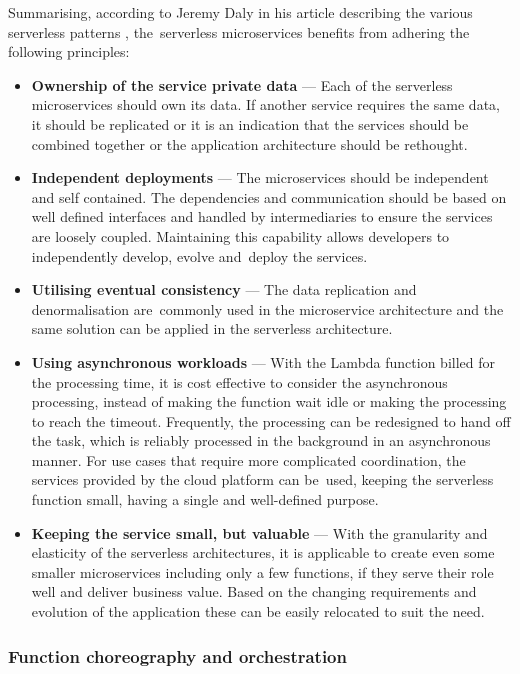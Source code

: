 Summarising, according to Jeremy Daly in his article describing the various serverless patterns \cite{ServerlessMicroservicePatternsForAWS}, the~serverless microservices benefits from adhering the following principles:

\begin{itemize}
   \item \textbf{Ownership of the service private data} --- Each of the serverless microservices should own its data. If another service requires the same data, it should be replicated or it is an indication that the services should be combined together or the application architecture should be rethought.
   \item \textbf{Independent deployments} --- The microservices should be independent and self contained. The dependencies and communication should be based on well defined interfaces and handled by intermediaries to ensure the services are loosely coupled. Maintaining this capability allows developers to independently develop, evolve and~deploy the services.
   \item \textbf{Utilising eventual consistency} --- The data replication and denormalisation are~commonly used in the microservice architecture and the same solution can be applied in the serverless architecture.
   \item \textbf{Using asynchronous workloads} ---
   With the Lambda function billed for the processing time, it is cost effective to consider the asynchronous processing, instead of making the function wait idle or making the processing to reach the timeout.
   Frequently, the processing can be redesigned to hand off the task, which is reliably processed in the background in an asynchronous manner.
   For use cases that require more complicated coordination, the services provided by the cloud platform can be~used, keeping the serverless function small, having a single and well-defined purpose.
   \item \textbf{Keeping the service small, but valuable} ---
   With the granularity and elasticity of the serverless architectures, it is applicable to create even some smaller microservices including only a few functions, if they serve their role well and deliver business value.
   Based on the changing requirements and evolution of the application these can be easily relocated to suit the need.
\end{itemize}

\subsubsection{Function choreography and orchestration} \label{chapter:serverless-processing-function-composition-and-orchestration}


